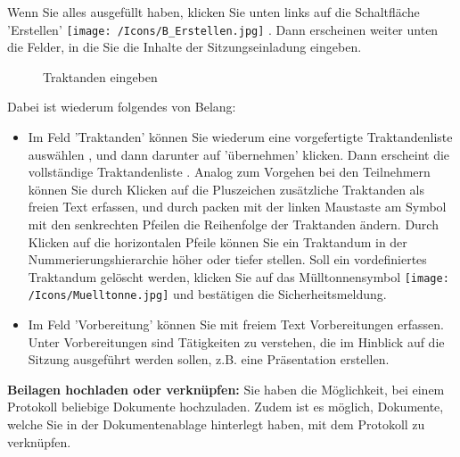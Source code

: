 Wenn Sie alles ausgefüllt haben, klicken Sie unten links auf die Schaltfläche 'Erstellen' \texttt{[image: /Icons/B\_Erstellen.jpg]} . Dann erscheinen weiter unten die Felder, in die Sie die Inhalte der Sitzungseinladung eingeben.

\begin{figure}[H]
\caption{Traktanden eingeben}
\end{figure}

Dabei ist wiederum folgendes von Belang:

\begin{itemize}
\item 
Im Feld 'Traktanden' können Sie wiederum eine vorgefertigte Traktandenliste auswählen , und dann darunter auf 'übernehmen'  klicken. Dann erscheint die vollständige Traktandenliste . Analog zum Vorgehen bei den Teilnehmern können Sie durch Klicken auf die Pluszeichen  zusätzliche Traktanden als freien Text erfassen, und durch packen mit der linken Maustaste am Symbol mit den senkrechten Pfeilen  die Reihenfolge der Traktanden ändern. Durch Klicken auf die horizontalen Pfeile  können Sie ein Traktandum in der Nummerierungshierarchie höher oder tiefer stellen. Soll ein vordefiniertes Traktandum gelöscht werden, klicken Sie auf das Mülltonnensymbol \texttt{[image: /Icons/Muelltonne.jpg]}  und bestätigen die Sicherheitsmeldung.
\item 
Im Feld 'Vorbereitung' können Sie mit freiem Text Vorbereitungen  erfassen. Unter Vorbereitungen sind Tätigkeiten zu verstehen, die im Hinblick auf die Sitzung ausgeführt werden sollen, z.B. eine Präsentation erstellen.
\end{itemize}

\textbf{Beilagen hochladen oder verknüpfen:}
Sie haben die Möglichkeit, bei einem Protokoll beliebige Dokumente hochzuladen. Zudem ist es möglich, Dokumente, welche Sie in der Dokumentenablage hinterlegt haben, mit dem Protokoll zu verknüpfen.  

